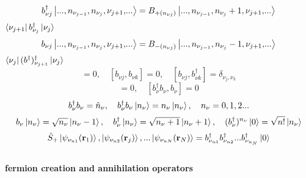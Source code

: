 \documentclass{article}
\begin{document}
\begin{equation*}
    b^{\dagger}_{\nu j}\ket{...,n_{\nu_{j-1}},n_{\nu_{j}},{\nu_{j+1},}...} = B_{+(n_{\nu j})} \ket{...,n_{\nu_{j-1}},n_{\nu_{j}} + 1,{\nu_{j+1},}...}
\end{equation*} 
$\bra{\nu_{j+1}} b^{\dagger}_{\nu_j} \ket{\nu_{j}}$
\begin{equation*}
    b_{\nu j}\ket{...,n_{\nu_{j-1}},n_{\nu_{j}},{\nu_{j+1},}...} = B_{-(n_{\nu j})} \ket{...,n_{\nu_{j-1}},n_{\nu_{j}} - 1,{\nu_{j+1},}...}
\end{equation*}
$\bra{\nu_{j}} (b^{\dagger})^{\dagger}_{\nu_{j+1}} \ket{\nu_{j}}$
\begin{equation*}
    [ b^{\dagger}_{\nu j} ,b^{\dagger}_{\nu k} ] = 0 ,\quad [ b_{\nu j} ,b_{\nu k} ] = 0  ,\quad [ b_{\nu j} ,b^{\dagger}_{\nu k} ] = \delta_{\nu_j,\nu_k}
\end{equation*}
\begin{equation*}  
    [ b^{\dagger}_{\nu} b_\nu , b_\nu] = 0 ,\quad [ b^{\dagger}_{\nu} b_\nu , b_\nu] = 0
\end{equation*}
\begin{equation*}
    b^{\dagger}_{\nu} b_\nu = \hat{n}_{\nu} , \quad  b^{\dagger}_{\nu} b_\nu \ket{n_{\nu}} = n_{\nu} \ket{n_{\nu}} , \quad  n_{\nu}=0,1,2...
\end{equation*}
\begin{equation*}
    b_{\nu}\ket{n_{\nu}}=\sqrt{n_{\nu}}\ket{n_{\nu}-1} , \quad b^{\dagger}_{\nu}\ket{n_{\nu}}=\sqrt{n_{\nu}+1}\ket{n_{\nu}+1},\quad  (b^{\dagger}_{\nu})^{n_{\nu}}\ket{0}=\sqrt{n!}\ket{n_{\nu}}
\end{equation*}
\begin{equation*}
    \hat{S}_{+} \ket{\psi_{\nu_{n1}}(\textbf{r}_1)},\ket{\psi_{\nu_{n2}}(\textbf{r}_j)},...\ket{\psi_{\nu_{nN}}(\textbf{r}_N)}=b^{\dagger}_{\nu_{n1}}b^{\dagger}_{\nu_{n2}}...b^{\dagger}_{\nu_{n_N}}\ket{0}
\end{equation*}
    \\
\textbf{fermion creation and annihilation operators}
\end{document}

